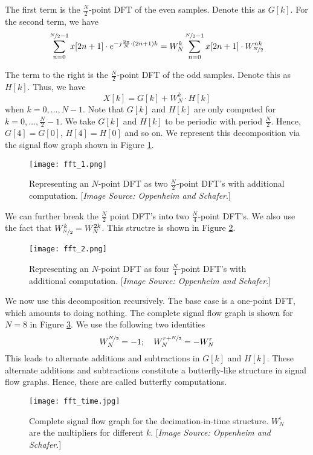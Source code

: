 \documentclass{article}
\theoremstyle{definition}
\begin{document}
The first term is the $\frac{N}{2}$-point DFT of the even samples. Denote this as $G[k]$. For the second term, we have 
\[
    \sum_{n=0}^{\nicefrac{N}{2} - 1} x[2n+1] \cdot e^{-j \frac{2\pi}{N} \cdot (2n+1)k} = W_{N}^{k} \sum_{n=0}^{\nicefrac{N}{2}-1} x[2n+1] \cdot W_{\nicefrac{N}{2}}^{nk}
\]

The term to the right is the $\frac{N}{2}$-point DFT of the odd samples. Denote this as $H[k]$. Thus, we have 
\[
    X[k] = G[k] + W_{N}^{k} \cdot H[k] 
\]
when $k = 0, \ldots , N -1$. Note that $G[k]$ and $H[k]$ are only computed for $k = 0, \ldots , \frac{N}{2} - 1$. We take $G[k]$ and $H[k]$ to be periodic with period $\frac{N}{2}$. Hence, $G[4] = G[0]$, $H[4] = H[0]$ and so on. We represent this decomposition via the signal flow graph shown in Figure \ref{fft_1}.

\begin{figure}[!h]
    \centering
    \texttt{[image: fft\_1.png]}
    \caption{Representing an $N$-point DFT as two $\frac{N}{2}$-point DFT's with additional computation. [\textit{Image Source: Oppenheim and Schafer}.]}
    \label{fft_1}
\end{figure}

We can further break the $\frac{N}{2}$ point DFT's into two $\frac{N}{4}$-point DFT's. We also use the fact that $W_{\nicefrac{N}{2}}^{k} = W_{N}^{2k}$. This structre is shown in Figure \ref{fig:fft_2}.


\begin{figure}[!h]
    \centering
    \texttt{[image: fft\_2.png]}
    \caption{Representing an $N$-point DFT as four $\frac{N}{4}$-point DFT's with additional computation. [\textit{Image Source: Oppenheim and Schafer}.]}
    \label{fig:fft_2}
\end{figure}

We now use this decomposition recursively. The base case is a one-point DFT, which amounts to doing nothing. The complete signal flow graph is shown for $N=8$ in Figure \ref{fig:fft_time}. We use the following two identities
\[
    W_{N}^{\nicefrac{N}{2}} = -1 ; \quad W_{N}^{r+\nicefrac{N}{2}} = -W_{N}^{r}
\]
This leads to alternate additions and subtractions in $G[k]$ and $H[k]$. These alternate additions and subtractions constitute a butterfly-like structure in signal flow graphs. Hence, these are called butterfly computations. \medskip

\begin{figure}[!h]
    \centering
    \texttt{[image: fft\_time.jpg]}
    \caption{Complete signal flow graph for the decimation-in-time structure. $W_{N}^{i}$ are the multipliers for different $k$. [\textit{Image Source: Oppenheim and Schafer}.]}
    \label{fig:fft_time}
\end{figure}
\end{document}
